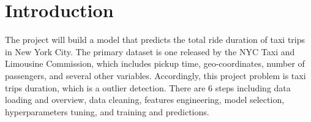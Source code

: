 \section{Introduction}\label{sec-intro}
The project will build a model that predicts the total ride duration of taxi trips
in New York City. The primary dataset is one released by the NYC Taxi and
Limousine Commission, which includes pickup time, geo-coordinates, number of
passengers, and several other variables. Accordingly, this project problem is taxi
trips duration, which is a outlier detection. There are 6 steps including data loading
and overview, data cleaning, features engineering, model selection, hyperparameters
tuning, and training and predictions.












